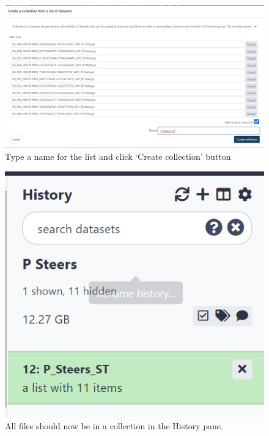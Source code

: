 \documentclass[
]{book}
\begin{document}
\begin{figure}

{\centering \includegraphics[width=1\linewidth]{images/image007} 

}

\caption{Type a name for the list and click ‘Create collection’ button}\label{fig:chunk7}
\end{figure}

\begin{figure}

{\centering \includegraphics[width=6.01in]{images/image008} 

}

\caption{All files should now be in a collection in the History pane.}\label{fig:chunk8}
\end{figure}
\end{document}
